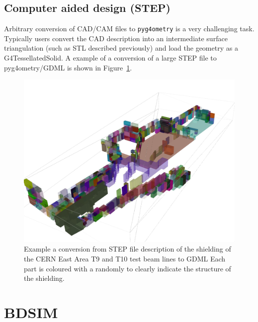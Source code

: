 \documentclass[a4paper,
               keeplastbox,   %
               ]{jacow}
\begin{document}
\subsection{Computer aided design (STEP)}
Arbitrary conversion of CAD/CAM files to \verb|pyg4ometry| is a very challenging task. Typically users convert the CAD description into
an intermediate surface triangulation (such as STL described previously) and load the geometry as a G4TessellatedSolid.
A example of a conversion of a large STEP file to pyg4ometry/GDML is shown in Figure~\ref{fig:ea910}.
\begin{figure}[!htb]
   \centering
   \includegraphics*[width=.9\columnwidth]{./examples/ea9-10.jpg}
   \caption{Example a conversion from STEP file description of the shielding of the CERN East Area T9 and T10 test beam lines to GDML Each part is 
   coloured with a randomly to clearly indicate the structure of the shielding.}
   \label{fig:ea910}
\end{figure}


\section{BDSIM}
\end{document}

